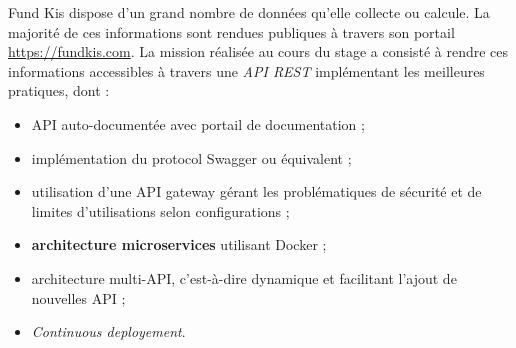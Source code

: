 Fund Kis dispose d'un grand nombre de données qu'elle collecte ou calcule. La majorité de ces informations sont rendues publiques à travers son portail \url{https://fundkis.com}. La mission réalisée au cours du stage a consisté à rendre ces informations accessibles à travers une \textit{API REST} implémentant les meilleures pratiques, dont :
\begin{itemize}[font=\color{blue}, label=]
  \item API auto-documentée avec portail de documentation ;
  \item implémentation du protocol Swagger ou équivalent ;
  \item utilisation d'une API gateway gérant les problématiques de sécurité et de limites d'utilisations selon configurations ;
  \item \textbf{architecture microservices} utilisant Docker ;
  \item architecture multi-API, c'est-à-dire dynamique et facilitant l'ajout de nouvelles API ;
  \item \textit{Continuous deployement}.
\end{itemize}

\vspace{3mm}

